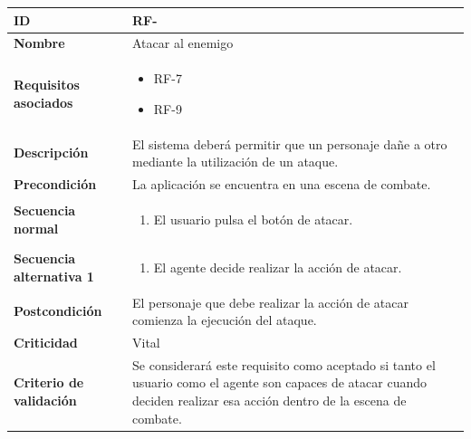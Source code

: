 \begin{center}
	\begin{tabular}{ | p{4.7cm} | p{10cm} | } 
		\hline
		
		\textbf{ID} & RF-\arabic{contador_requisitos_funcionales}
		{contador_requisitos_funcionales} \\
		
		\hline 
		\textbf{Nombre} &
		Atacar al enemigo\\ 
		
		\hline
		\textbf{Requisitos asociados} & 
		\begin{itemize}
			\item RF-7
			\item RF-9
		\end{itemize}\\
		
		\hline
		\textbf{Descripción} & 
		El sistema deberá permitir que un personaje dañe a otro mediante la utilización de un ataque.\\
		
		\hline
		\textbf{Precondición} & 
		La aplicación se encuentra en una escena de combate.\\
		
		\hline
		\textbf{Secuencia normal} &
		\begin{enumerate}
			\item El usuario pulsa el botón de atacar.
		\end{enumerate}
		\\
		
		\hline
		\textbf{Secuencia alternativa 1} &
		\begin{enumerate}
			\item El agente decide realizar la acción de atacar.
		\end{enumerate}
		\\
		
		\hline
		\textbf{Postcondición} & 
		El personaje que debe realizar la acción de atacar comienza la ejecución del ataque.\\
		
		\hline 
		\textbf{Criticidad} &
		Vital\\
		
		\hline 
		\textbf{Criterio de validación} & 
		Se considerará este requisito como aceptado si tanto el usuario como el agente son capaces de atacar cuando deciden realizar esa acción dentro de la escena de combate.\\
		
		\hline
	\end{tabular}
\end{center}

